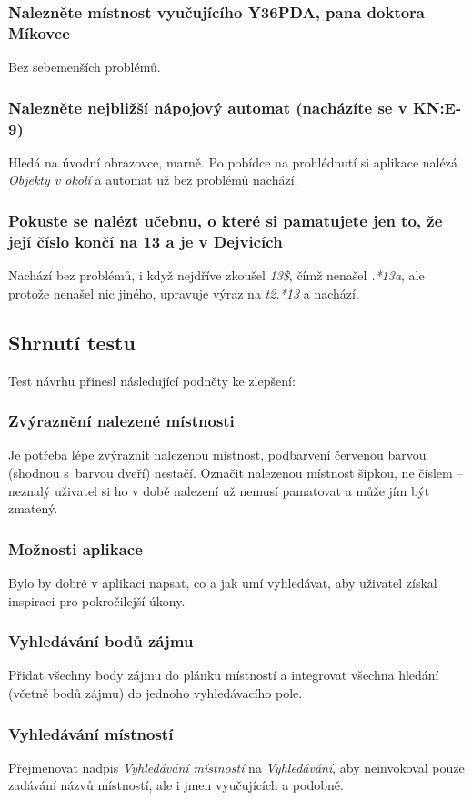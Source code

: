 \subsubsection*{Nalezněte místnost vyučujícího Y36PDA, pana doktora Míkovce}
Bez sebemenších problémů.
\subsubsection*{Nalezněte nejbližší nápojový automat (nacházíte se v KN:E-9)}
Hledá na úvodní obrazovce, marně. Po pobídce na prohlédnutí si aplikace nalézá \emph{Objekty v okolí} a automat už bez problémů nachází.
\subsubsection*{Pokuste se nalézt učebnu, o které si pamatujete jen to, že její číslo končí na 13 a je v Dejvicích}
Nachází bez problémů, i když nejdříve zkoušel \emph{13\$}, čímž nenašel \emph{.*13a}, ale protože nenašel nic jiného, upravuje výraz na \emph{t2.*13} a nachází.

\subsection{Shrnutí testu}
Test návrhu přinesl následující podněty ke zlepšení:
\subsubsection*{Zvýraznění nalezené místnosti}
Je potřeba lépe zvýraznit nalezenou místnost, podbarvení červenou barvou (shodnou s~barvou dveří) nestačí. Označit nalezenou místnost šipkou, ne číslem -- neznalý uživatel si ho v době nalezení už nemusí pamatovat a může jím být zmatený.
\subsubsection*{Možnosti aplikace}
Bylo by dobré v aplikaci napsat, co a jak umí vyhledávat, aby uživatel získal inspiraci pro pokročilejší úkony.
\subsubsection*{Vyhledávání bodů zájmu}
Přidat všechny body zájmu do plánku místností a integrovat všechna hledání (včetně bodů zájmu) do jednoho vyhledávacího pole.
\subsubsection*{Vyhledávání místností}
Přejmenovat nadpis \emph{Vyhledávání místností} na \emph{Vyhledávání}, aby neinvokoval pouze zadávání názvů místností, ale i jmen vyučujících a podobně.
